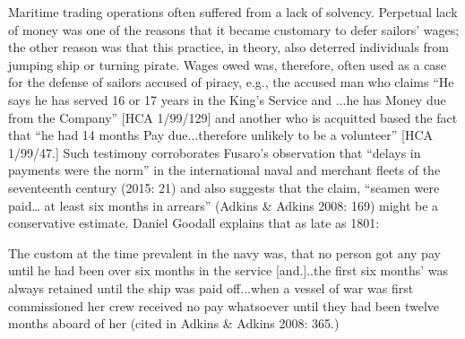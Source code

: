 \begin{styleStandard}
Maritime trading operations often suffered from a lack of solvency. Perpetual lack of money was one of the reasons that it became customary to defer sailors’ wages; the other reason was that this practice, in theory, also deterred individuals from jumping ship or turning pirate. Wages owed was, therefore, often used as a case for the defense of sailors accused of piracy, e.g., the accused man who claims “He says he has served 16 or 17 years in the King’s Service and ...he has Money due from the Company” [HCA 1/99/129] and another who is acquitted based the fact that “he had 14 months Pay due...therefore unlikely to be a volunteer” [HCA 1/99/47.] Such testimony corroborates Fusaro’s observation that “delays in payments were the norm” in the international naval and merchant fleets of the seventeenth century (2015: 21) and also suggests that the claim, “seamen were paid… at least six months in arrears” (Adkins \& Adkins 2008: 169) might be a conservative estimate. Daniel Goodall explains that as late as 1801:
\end{styleStandard}


\begin{styleStandard}
The custom at the time prevalent in the navy was, that no person got any pay until he had been over six months in the service [and.]..the first six months’ was always retained until the ship was paid off...when a vessel of war was first commissioned her crew received no pay whatsoever until they had been twelve months aboard of her (cited in Adkins \& Adkins 2008: 365.)
\end{styleStandard}


